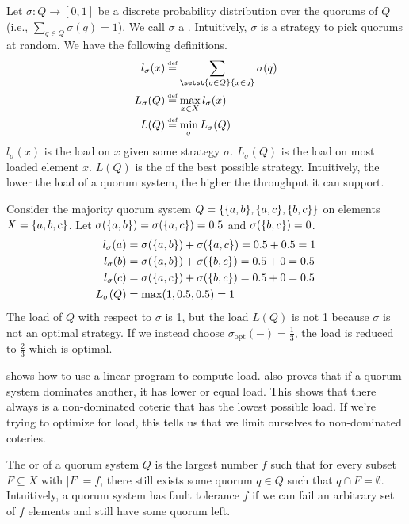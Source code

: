 Let $\sigma: Q \to [0, 1]$ be a discrete probability distribution over the
quorums of $Q$ (i.e., $\sum_{q \in Q} \sigma(q) = 1$). We call $\sigma$ a
. Intuitively, $\sigma$ is a strategy to pick quorums at
random. We have the following definitions.
\begin{align*}
  l_\sigma(x) &\defeq \sum_{\setst{q \in Q}{x \in q}} \sigma(q) \\
  L_\sigma(Q) &\defeq \max_{x \in X} l_\sigma(x) \\
  L(Q)        &\defeq \min_\sigma L_\sigma(Q)
\end{align*}
$l_\sigma(x)$ is the load on $x$ given some strategy $\sigma$. $L_\sigma(Q)$ is
the load on most loaded element $x$. $L(Q)$ is the  of the best
possible strategy. Intuitively, the lower the load of a quorum system, the
higher the throughput it can support.

\begin{example}
  Consider the majority quorum system $Q = \{\{a, b\}, \{a, c\}, \{b,
  c\}\}$ on elements $X = \{a, b, c\}$. Let $\sigma(\{a, b\}) =
  \sigma(\{a, c\}) = 0.5$ and $\sigma(\{b, c\}) = 0$.
  \begin{align*}
    l_\sigma(a) &= \sigma(\{a, b\}) + \sigma(\{a, c\}) = 0.5 + 0.5 = 1 \\
    l_\sigma(b) &= \sigma(\{a, b\}) + \sigma(\{b, c\}) = 0.5 + 0 = 0.5 \\
    l_\sigma(c) &= \sigma(\{a, c\}) + \sigma(\{b, c\}) = 0.5 + 0 = 0.5 \\
    L_\sigma(Q) &= \max(1, 0.5, 0.5) = 1
  \end{align*}
  The load of $Q$ with respect to $\sigma$ is 1, but the load $L(Q)$ is not 1
  because $\sigma$ is not an optimal strategy. If we instead choose
  $\sigma_{\text{opt}}(-) = \frac{1}{3}$, the load is reduced to $\frac{2}{3}$
  which is optimal.
\end{example}

\cite{naor1998load} shows how to use a linear program to compute load.
\cite{naor1998load} also proves that if a quorum system dominates another, it
has lower or equal load. This shows that there always is a non-dominated
coterie that has the lowest possible load. If we're trying to optimize for
load, this tells us that we limit ourselves to non-dominated coteries.

The  or  of a quorum system $Q$ is
the largest number $f$ such that for every subset $F \subseteq X$ with $|F| =
f$, there still exists some quorum $q \in Q$ such that $q \cap F = \emptyset$.
Intuitively, a quorum system has fault tolerance $f$ if we can fail an
arbitrary set of $f$ elements and still have some quorum left.

